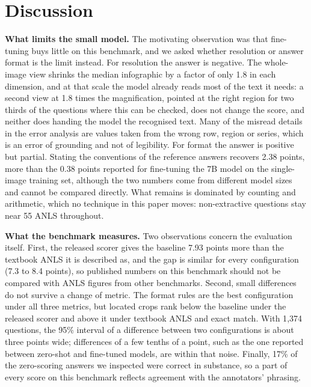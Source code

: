 \documentclass[conference]{IEEEtran}
\newcommand{\MedianDown}{1.8}
\newcommand{\MedianZoom}{1.8}
\begin{document}
\section{Discussion}
\textbf{What limits the small model.} The motivating observation was that fine-tuning buys little on this benchmark, and we asked whether resolution or answer format is the limit instead. For resolution the answer is negative. The whole-image view shrinks the median infographic by a factor of only \MedianDown{} in each dimension, and at that scale the model already reads most of the text it needs: a second view at \MedianZoom{} times the magnification, pointed at the right region for two thirds of the questions where this can be checked, does not change the score, and neither does handing the model the recognised text. Many of the misread details in the error analysis are values taken from the wrong row, region or series, which is an error of grounding and not of legibility. For format the answer is positive but partial. Stating the conventions of the reference answers recovers 2.38 points, more than the 0.38 points reported for fine-tuning the 7B model on the single-image training set, although the two numbers come from different model sizes and cannot be compared directly. What remains is dominated by counting and arithmetic, which no technique in this paper moves: non-extractive questions stay near 55 ANLS throughout.

\textbf{What the benchmark measures.} Two observations concern the evaluation itself. First, the released scorer gives the baseline 7.93 points more than the textbook ANLS it is described as, and the gap is similar for every configuration (7.3 to 8.4 points), so published numbers on this benchmark should not be compared with ANLS figures from other benchmarks. Second, small differences do not survive a change of metric. The format rules are the best configuration under all three metrics, but located crops rank below the baseline under the released scorer and above it under textbook ANLS and exact match. With 1{,}374 questions, the 95\% interval of a difference between two configurations is about three points wide; differences of a few tenths of a point, such as the one reported between zero-shot and fine-tuned models, are within that noise. Finally, 17\% of the zero-scoring answers we inspected were correct in substance, so a part of every score on this benchmark reflects agreement with the annotators' phrasing.
\end{document}
